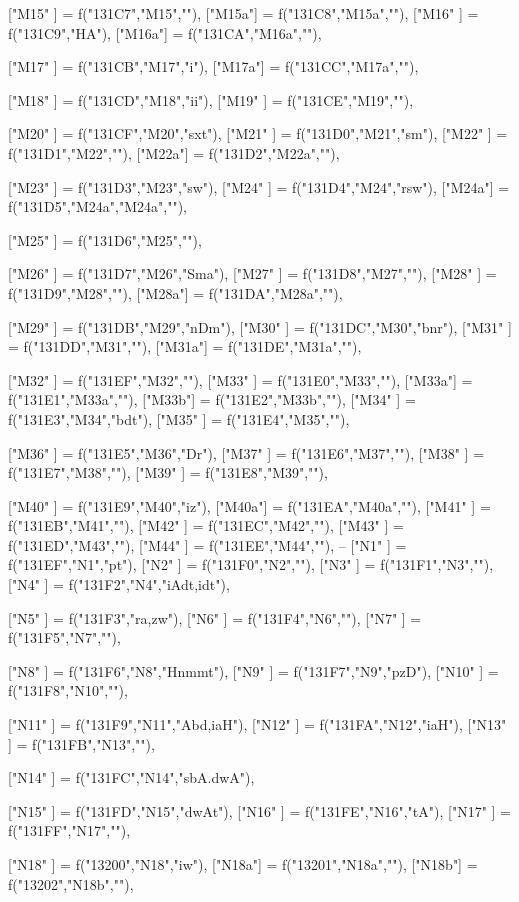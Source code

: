 {["M15" ] = f("131C7","M15",""),
["M15a"] = f("131C8","M15a",""),
["M16" ] = f("131C9","HA"),
["M16a"] = f("131CA","M16a",""),

["M17" ] = f("131CB","M17","i"),
["M17a"] = f("131CC","M17a",""),

["M18" ] = f("131CD","M18","ii"),
["M19" ] = f("131CE","M19",""),

["M20" ] = f("131CF","M20","sxt"),
["M21" ] = f("131D0","M21","sm"),
["M22" ] = f("131D1","M22",""),
["M22a"] = f("131D2","M22a",""),

["M23" ] = f("131D3","M23","sw"),
["M24" ]  = f("131D4","M24","rsw"),
["M24a"] = f("131D5","M24a","M24a",""),

["M25" ] = f("131D6","M25",""),

["M26" ] = f("131D7","M26","Sma"),
["M27" ] = f("131D8","M27",""),
["M28" ] = f("131D9","M28",""),
["M28a"] = f("131DA","M28a",""),

["M29" ] = f("131DB","M29","nDm"),
["M30" ] = f("131DC","M30","bnr"),
["M31" ] = f("131DD","M31",""),
["M31a"] = f("131DE","M31a",""),

["M32" ] = f("131EF","M32",""),
["M33" ] = f("131E0","M33",""),
["M33a"] = f("131E1","M33a",""),
    ["M33b"] = f("131E2","M33b",""),
["M34" ] = f("131E3","M34","bdt"),
["M35" ] = f("131E4","M35",""),

["M36" ] = f("131E5","M36","Dr"),
["M37" ] = f("131E6","M37",""),
["M38" ] = f("131E7","M38",""),
["M39" ] = f("131E8","M39",""),

["M40" ] = f("131E9","M40","iz"),
["M40a"] = f("131EA","M40a",""),
["M41" ] = f("131EB","M41",""),
["M42" ] = f("131EC","M42",""),
["M43" ] = f("131ED","M43",""),
["M44" ] = f("131EE","M44",""),
--
["N1"  ] = f("131EF","N1","pt"),
["N2"  ] = f("131F0","N2",""),
["N3"  ] = f("131F1","N3",""),
["N4"  ] = f("131F2","N4","iAdt,idt"),

["N5"  ] = f("131F3","ra,zw"),
["N6"  ] = f("131F4","N6",""),
["N7"  ] = f("131F5","N7",""),

["N8"  ] = f("131F6","N8","Hnmmt"),
["N9"  ] = f("131F7","N9","pzD"),
["N10" ] = f("131F8","N10",""),

["N11" ] = f("131F9","N11","Abd,iaH"),
["N12" ] = f("131FA","N12","iaH"),
["N13" ] = f("131FB","N13",""),

["N14" ] = f("131FC","N14","sbA.dwA"),

["N15" ] = f("131FD","N15","dwAt"),
["N16" ] = f("131FE","N16","tA"),
["N17" ] = f("131FF","N17",""),

["N18" ] = f("13200","N18","iw"),
["N18a"] = f("13201","N18a",""),
["N18b"] = f("13202","N18b",""),

}
